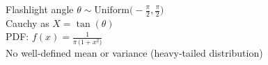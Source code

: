 \documentclass[preview]{standalone}
\begin{document}
Flashlight angle $\theta \sim \mathrm{Uniform}\!\bigl(-\tfrac{\pi}{2}, \tfrac{\pi}{2}\bigr)$\\Cauchy as $X = \tan(\theta)$\\PDF: $\displaystyle f(x) = \frac{1}{\pi\,\bigl(1 + x^2\bigr)}$\\No well-defined mean or variance (heavy-tailed distribution)\\
\end{document}
